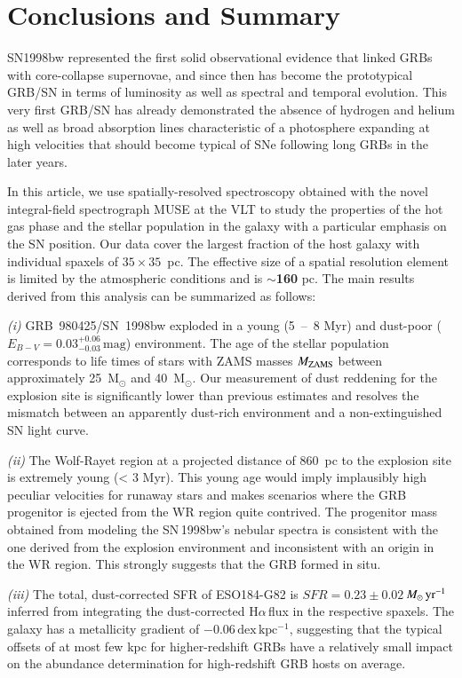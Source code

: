 \documentclass[traditabstract]{aa}
\newcommand{\ha}{H$\alpha$}
\newcommand{\Msunyr}{$M_\odot\,\rm{yr}^{-1}$}
\begin{document}
\section{Conclusions and Summary}

SN1998bw represented the first solid observational evidence that linked GRBs with core-collapse supernovae, and since then has become the prototypical GRB/SN in terms of luminosity as well as spectral and temporal evolution. This very first GRB/SN has already demonstrated the absence of hydrogen and helium as well as broad absorption lines characteristic of a photosphere expanding at high velocities that should become typical of SNe following long GRBs in the later years.

In this article, we use spatially-resolved spectroscopy obtained with the novel integral-field spectrograph MUSE at the VLT to study the properties of the hot gas phase and the stellar population in the galaxy with a particular emphasis on the SN position. Our data cover the largest fraction of the host galaxy with individual spaxels of $35 \times 35$~pc. The effective size of a spatial resolution element is limited by the atmospheric conditions and is $\sim$\textbf{160} pc. The main results derived from this analysis can be summarized as follows:

\textit{(i)} GRB~980425/SN~1998bw exploded in a young (5~--~8 Myr) and dust-poor ($E_{B-V} = 0.03_{-0.03}^{+0.06}\,\mathrm{mag}$) environment. The age of the stellar population corresponds to life times of stars with ZAMS masses $M_{\rm{ZAMS}}$  between approximately 25~M$_{\odot}$ and 40~M$_{\odot}$. Our measurement of dust reddening for the explosion site is significantly lower than previous estimates and resolves the mismatch between an apparently dust-rich environment and a non-extinguished SN light curve.

\textit{(ii)} The Wolf-Rayet region at a projected distance of 860~pc to the explosion site is extremely young (< 3 Myr). This young age would imply implausibly high peculiar velocities for runaway stars and makes scenarios where the GRB progenitor is ejected from the WR region quite contrived. The progenitor mass obtained from modeling the SN\,1998bw's nebular spectra \citep{2006ApJ...640..854M} is consistent with the one derived from the explosion environment and inconsistent with an origin in the WR region. This strongly suggests that the GRB formed in situ.

\textit{(iii)} The total, dust-corrected SFR of ESO184-G82 is $SFR=0.23\pm0.02$\,\Msunyr inferred from integrating the dust-corrected \ha\,flux in the respective spaxels. The galaxy has a metallicity gradient of $-0.06\,\mathrm{dex\,kpc^{-1}}$, suggesting that the typical offsets of at most few kpc for higher-redshift GRBs have a relatively small impact on the abundance determination for high-redshift GRB hosts on average.
\end{document}
